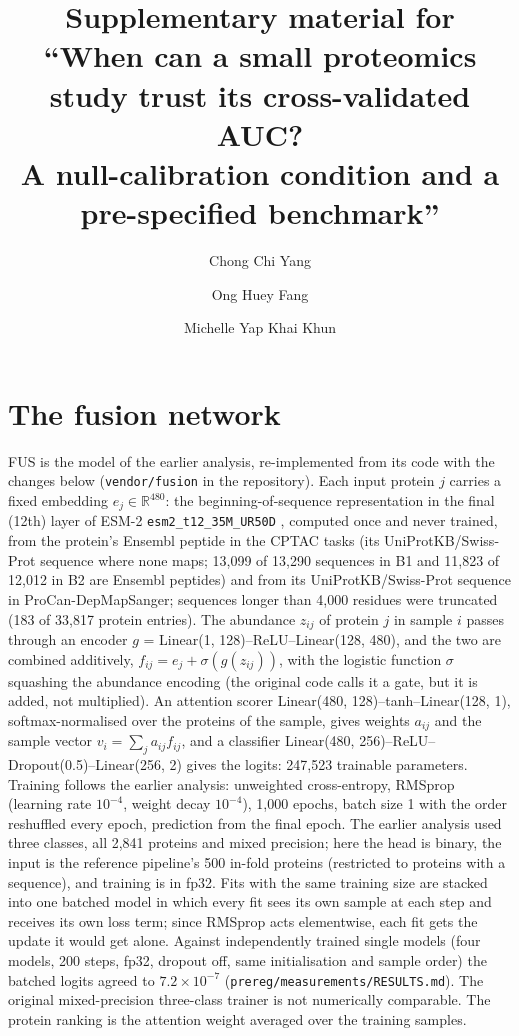 \documentclass[10pt,letterpaper]{article}
\title{Supplementary material for\\
``When can a small proteomics study trust its cross-validated AUC?\\
A null-calibration condition and a pre-specified benchmark''}
\author[1]{Chong Chi Yang}
\author[1]{Ong Huey Fang}
\author[2]{Michelle Yap Khai Khun}
\affil[1]{School of Information Technology, Monash University Malaysia, Bandar Sunway, Malaysia}
\affil[2]{School of Science, Monash University Malaysia, Bandar Sunway, Malaysia}
\date{}
\begin{document}
\maketitle

\section{The fusion network}\label{sup:fus}
FUS is the model of the earlier analysis, re-implemented from its code with the changes below (\texttt{vendor/fusion}
in the repository). Each input protein $j$ carries a fixed embedding $e_j \in \mathbb{R}^{480}$: the
beginning-of-sequence representation in the final (12th) layer of ESM-2 \texttt{esm2\_t12\_35M\_UR50D}
\citep{lin2023esm2}, computed once and never trained, from the protein's Ensembl peptide in the CPTAC tasks
(its UniProtKB/Swiss-Prot sequence where none maps; 13,099 of 13,290 sequences in B1 and 11,823 of 12,012 in
B2 are Ensembl peptides) and from its UniProtKB/Swiss-Prot sequence in ProCan-DepMapSanger; sequences longer than 4,000 residues were truncated (183 of
33,817 protein entries). The abundance $z_{ij}$ of protein $j$ in sample $i$ passes through an encoder
$g$ = Linear(1, 128)--ReLU--Linear(128, 480), and the two are combined additively,
$f_{ij} = e_j + \sigma(g(z_{ij}))$, with the logistic function $\sigma$ squashing the abundance encoding (the
original code calls it a gate, but it is added, not multiplied). An attention scorer
Linear(480, 128)--tanh--Linear(128, 1), softmax-normalised over the proteins of the sample, gives weights
$a_{ij}$ and the sample vector $v_i = \sum_j a_{ij} f_{ij}$, and a classifier
Linear(480, 256)--ReLU--Dropout(0.5)--Linear(256, 2) gives the logits: 247,523 trainable parameters. Training
follows the earlier analysis: unweighted cross-entropy, RMSprop (learning rate $10^{-4}$, weight decay
$10^{-4}$), 1,000 epochs, batch size 1 with the order reshuffled every epoch, prediction from the final epoch.
The earlier analysis used three classes, all 2,841 proteins and mixed precision; here the head is binary, the
input is the reference pipeline's 500 in-fold proteins (restricted to proteins with a sequence), and training
is in fp32. Fits with the same training size are stacked into one batched model in which every fit sees its
own sample at each step and receives its own loss term; since RMSprop acts elementwise, each fit gets the
update it would get alone. Against independently trained single models (four models, 200 steps, fp32, dropout
off, same initialisation and sample order) the batched logits agreed to $7.2 \times 10^{-7}$
(\texttt{prereg/measurements/RESULTS.md}). The original mixed-precision three-class trainer is not
numerically comparable. The protein ranking is the attention weight averaged over the training samples.
\end{document}
